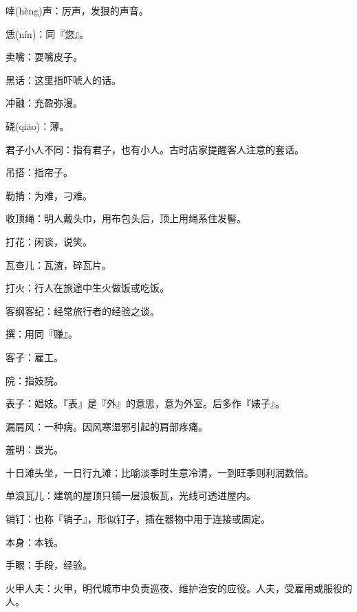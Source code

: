 \startbuffer[2203]
啈(hèng)声：厉声，发狠的声音。
\stopbuffer


\startbuffer[2204]
恁(nín)：同『您』。
\stopbuffer


\startbuffer[2205]
卖嘴：耍嘴皮子。
\stopbuffer


\startbuffer[2206]
黑话：这里指吓唬人的话。
\stopbuffer


\startbuffer[2207]
冲融：充盈弥漫。
\stopbuffer


\startbuffer[2208]
硗(qiāo)：薄。
\stopbuffer


\startbuffer[2209]
君子小人不同：指有君子，也有小人。古时店家提醒客人注意的套话。
\stopbuffer


\startbuffer[2210]
吊搭：指帘子。
\stopbuffer


\startbuffer[2211]
勒掯：为难，刁难。
\stopbuffer


\startbuffer[2212]
收顶绳：明人戴头巾，用布包头后，顶上用绳系住发髻。
\stopbuffer


\startbuffer[2213]
打花：闲谈，说笑。
\stopbuffer


\startbuffer[2214]
瓦查儿：瓦渣，碎瓦片。
\stopbuffer


\startbuffer[2215]
打火：行人在旅途中生火做饭或吃饭。
\stopbuffer


\startbuffer[2216]
客纲客纪：经常旅行者的经验之谈。
\stopbuffer


\startbuffer[2217]
撰：用同『赚』。
\stopbuffer


\startbuffer[2218]
客子：雇工。
\stopbuffer


\startbuffer[2219]
院：指妓院。
\stopbuffer


\startbuffer[2220]
表子：娼妓。『表』是『外』的意思，意为外室。后多作『婊子』。
\stopbuffer


\startbuffer[2221]
漏肩风：一种病。因风寒湿邪引起的肩部疼痛。
\stopbuffer


\startbuffer[2222]
羞明：畏光。
\stopbuffer


\startbuffer[2223]
十日滩头坐，一日行九滩：比喻淡季时生意冷清，一到旺季则利润数倍。
\stopbuffer


\startbuffer[2224]
单浪瓦儿：建筑的屋顶只铺一层浪板瓦，光线可透进屋内。
\stopbuffer


\startbuffer[2225]
销钉：也称『销子』，形似钉子，插在器物中用于连接或固定。
\stopbuffer


\startbuffer[2226]
本身：本钱。
\stopbuffer


\startbuffer[2227]
手眼：手段，经验。
\stopbuffer


\startbuffer[2228]
火甲人夫：火甲，明代城市中负责巡夜、维护治安的应役。人夫，受雇用或服役的人。
\stopbuffer


